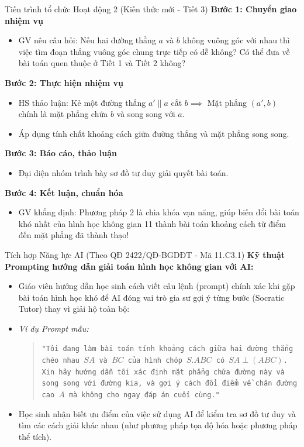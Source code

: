 \documentclass[12pt, a4paper]{article}
\begin{document}
\begin{pedabox}{Tiến trình tổ chức Hoạt động 2 (Kiến thức mới - Tiết 3)}
    \textbf{Bước 1: Chuyển giao nhiệm vụ}
    \begin{itemize}[leftmargin=0.6cm]
        \item GV nêu câu hỏi: Nếu hai đường thẳng $a$ và $b$ không vuông góc với nhau thì việc tìm đoạn thẳng vuông góc chung trực tiếp có dễ không? Có thể đưa về bài toán quen thuộc ở Tiết 1 và Tiết 2 không?
    \end{itemize}

    \textbf{Bước 2: Thực hiện nhiệm vụ}
    \begin{itemize}[leftmargin=0.6cm]
        \item HS thảo luận: Kẻ một đường thẳng $a' \parallel a$ cắt $b \implies$ Mặt phẳng $(a', b)$ chính là mặt phẳng chứa $b$ và song song với $a$.
        \item Áp dụng tính chất khoảng cách giữa đường thẳng và mặt phẳng song song.
    \end{itemize}

    \textbf{Bước 3: Báo cáo, thảo luận}
    \begin{itemize}[leftmargin=0.6cm]
        \item Đại diện nhóm trình bày sơ đồ tư duy giải quyết bài toán.
    \end{itemize}

    \textbf{Bước 4: Kết luận, chuẩn hóa}
    \begin{itemize}[leftmargin=0.6cm]
        \item GV khẳng định: Phương pháp 2 là chìa khóa vạn năng, giúp biến đổi bài toán khó nhất của hình học không gian 11 thành bài toán khoảng cách từ điểm đến mặt phẳng đã thành thạo!
    \end{itemize}
\end{pedabox}

\begin{aibox}{Tích hợp Năng lực AI (Theo QĐ 2422/QĐ-BGDĐT - Mã 11.C3.1)}
    \textbf{Kỹ thuật Prompting hướng dẫn giải toán hình học không gian với AI:}
    \begin{itemize}[leftmargin=0.6cm]
        \item Giáo viên hướng dẫn học sinh cách viết câu lệnh (prompt) chính xác khi gặp bài toán hình học khó để AI đóng vai trò gia sư gợi ý từng bước (Socratic Tutor) thay vì giải hộ toàn bộ:
        \item \textit{Ví dụ Prompt mẫu:}
        \begin{quote}
            \texttt{"Tôi đang làm bài toán tính khoảng cách giữa hai đường thẳng chéo nhau $SA$ và $BC$ của hình chóp $S.ABC$ có $SA \perp (ABC)$. Xin hãy hướng dẫn tôi xác định mặt phẳng chứa đường này và song song với đường kia, và gợi ý cách đổi điểm về chân đường cao $A$ mà không cho ngay đáp án cuối cùng."}
        \end{quote}
        \item Học sinh nhận biết ưu điểm của việc sử dụng AI để kiểm tra sơ đồ tư duy và tìm các cách giải khác nhau (như phương pháp tọa độ hóa hoặc phương pháp thể tích).
    \end{itemize}
\end{aibox}
\end{document}
